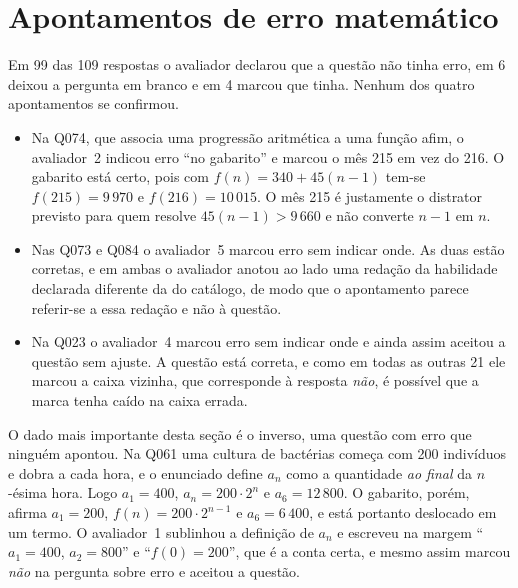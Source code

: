 \section{Apontamentos de erro matemático}
\label{sub:rodada1-erros}

Em 99 das 109 respostas o avaliador declarou que a questão não tinha erro, em 6 deixou a pergunta
em branco e em 4 marcou que tinha. Nenhum dos quatro apontamentos se confirmou.

\begin{itemize}
  \item Na Q074, que associa uma progressão aritmética a uma função afim, o avaliador~2 indicou
  erro ``no gabarito'' e marcou o mês 215 em vez do 216. O gabarito está certo, pois com
  $f(n) = 340 + 45(n-1)$ tem-se $f(215) = 9\,970$ e $f(216) = 10\,015$. O mês 215 é justamente o
  distrator previsto para quem resolve $45(n-1) > 9\,660$ e não converte $n-1$ em $n$.
  \item Nas Q073 e Q084 o avaliador~5 marcou erro sem indicar onde. As duas estão corretas, e em
  ambas o avaliador anotou ao lado uma redação da habilidade declarada diferente da do catálogo, de
  modo que o apontamento parece referir-se a essa redação e não à questão.
  \item Na Q023 o avaliador~4 marcou erro sem indicar onde e ainda assim aceitou a questão sem
  ajuste. A questão está correta, e como em todas as outras 21 ele marcou a caixa vizinha, que
  corresponde à resposta \emph{não}, é possível que a marca tenha caído na caixa errada.
\end{itemize}

O dado mais importante desta seção é o inverso, uma questão com erro que ninguém apontou. Na Q061
uma cultura de bactérias começa com 200 indivíduos e dobra a cada hora, e o enunciado define $a_n$
como a quantidade \emph{ao final} da $n$-ésima hora. Logo $a_1 = 400$, $a_n = 200 \cdot 2^n$ e
$a_6 = 12\,800$. O gabarito, porém, afirma $a_1 = 200$, $f(n) = 200 \cdot 2^{n-1}$ e
$a_6 = 6\,400$, e está portanto deslocado em um termo. O avaliador~1 sublinhou a definição de $a_n$
e escreveu na margem ``$a_1 = 400$, $a_2 = 800$'' e ``$f(0) = 200$'', que é a conta certa, e mesmo
assim marcou \emph{não} na pergunta sobre erro e aceitou a questão.

